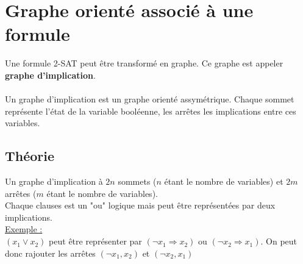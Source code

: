 \documentclass{article}
\begin{document}
    \section{Graphe orienté associé à une formule}
    Une formule 2-SAT peut être transformé en graphe. Ce graphe est appeler \textbf{graphe d'implication}. \\
    \\
    Un graphe d'implication est un graphe orienté assymétrique. Chaque sommet représente l'état de la variable booléenne, les arrêtes les implications entre ces variables.
    \subsection{Théorie}
    Un graphe d'implication à $2n$ sommets ($n$ étant le nombre de variables) et $2m$ arrêtes ($m$ étant le nombre de variables). \\
    Chaque clauses est un "ou" logique mais peut être représentées par deux implications. \\
    \underline{Exemple : } \\
    $(x_1 \lor x_2)$ peut être représenter par $(\neg x_1 \Longrightarrow x_2)$ ou $(\neg x_2 \Longrightarrow x_1)$. On peut donc rajouter les arrêtes $(\neg x_1, x_2)$ et $(\neg x_2, x_1)$    
    \newpage
\end{document}
